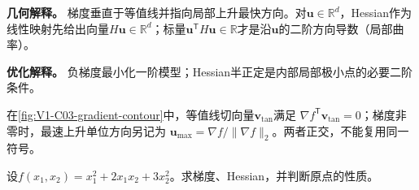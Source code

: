\documentclass[UTF8,a4paper,11pt,openany]{ctexbook}
\begin{document}
\setcounter{page}{41}
\setcounter{chapter}{3}
\setcounter{figure}{0}
\pagestyle{headings}
\begin{geometrybox}
\textbf{几何解释。} 梯度垂直于等值线并指向局部上升最快方向。对$\boldsymbol u\in\mathbb R^d$，Hessian作为线性映射先给出向量$H\boldsymbol u\in\mathbb R^d$；标量$\boldsymbol u^{\mathsf T}H\boldsymbol u\in\mathbb R$才是沿$\boldsymbol u$的二阶方向导数（局部曲率）。
\end{geometrybox}
\begin{optimizationbox}
\textbf{优化解释。} 负梯度最小化一阶模型；Hessian半正定是内部局部极小点的必要二阶条件。
\end{optimizationbox}

在\cref{fig:V1-C03-gradient-contour}中，等值线切向量$\boldsymbol v_{\mathrm{tan}}$满足
$\nabla f^{\mathsf T}\boldsymbol v_{\mathrm{tan}}=0$；梯度非零时，最速上升单位方向另记为
$\boldsymbol u_{\max}=\nabla f/\lVert\nabla f\rVert_2$。两者正交，不能复用同一符号。
\begin{example}[二元二次函数]
设$f(x_1,x_2)=x_1^2+2x_1x_2+3x_2^2$。求梯度、Hessian，并判断原点的性质。
\end{example}
\end{document}

